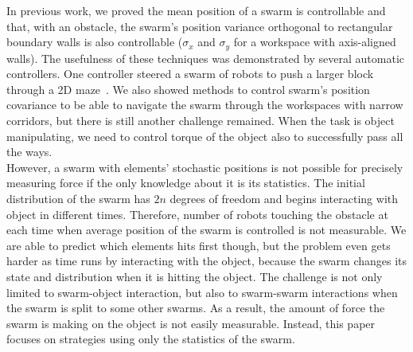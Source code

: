 In previous work, we proved the mean position of a swarm is controllable and that, with an obstacle, the swarm's position variance orthogonal to rectangular boundary walls  is also controllable
($\sigma_x$ and $\sigma_y$ for a workspace with axis-aligned walls). 
The usefulness of these techniques was demonstrated by several automatic controllers. One controller steered a swarm of robots to push a larger block through a 2D maze~\cite{ShahrokhiIROS2015}. 
We also showed methods to control swarm's position covariance to be able to navigate the swarm through the workspaces with narrow corridors, but there is still another challenge remained. When the task is object manipulating, we need to control torque of the object also to successfully pass all the ways. \\
However, a swarm with elements' stochastic positions is not possible for precisely measuring force if the only knowledge about it is its statistics. The initial distribution of the swarm has $2n$ degrees of freedom and begins interacting with object in different times. Therefore, number of robots touching the obstacle at each time when average position of the swarm is controlled is not measurable. We are able to predict which elements hits first though, but the problem even gets harder as time runs by interacting with the object, because the swarm changes its state and distribution when it is hitting the object. The challenge is not only limited to swarm-object interaction, but also to swarm-swarm interactions when the swarm is split to some other swarms. As a result, the amount of force the swarm is making on the object is not easily measurable. Instead, this paper focuses on strategies using only the statistics of the swarm.




